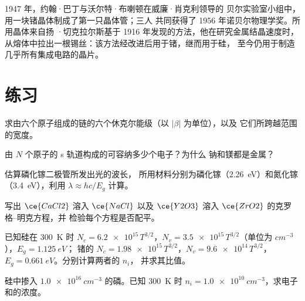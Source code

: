 \begin{history}[晶体管与提拉晶体]
1947 年，约翰·巴丁与沃尔特·布喇顿在威廉·肖克利领导的
贝尔实验室小组中，用一块锗晶体制成了第一只晶体管；三人
共同获得了 1956 年诺贝尔物理学奖。所用晶体来自扬
·切克拉尔斯基于 1916 年发现的方法，他在研究金属结晶速度时，
从熔体中拉出一根锡丝：该方法经改进后用于锗，继而用于硅，
至今仍用于制造几乎所有集成电路的晶片。
\end{history}

\section{练习}

\begin{exercise}[$\star$]\label{exo:b3:solid-state:1}
求由六个原子组成的链的六个休克尔能级（以 $|\beta|$ 为单位），以及
它们所跨越范围的宽度。
\end{exercise}

\begin{exercise}[$\star$]\label{exo:b3:solid-state:2}
由 $N$ 个原子的 s 轨道构成的可容纳多少个电子？为什么
钠和镁都是金属？
\end{exercise}

\begin{exercise}[$\star$]\label{exo:b3:solid-state:3}
估算磷化镓二极管所发出光的波长，
所用材料分别为磷化镓（\qty{2.26}{eV}）和氮化镓（\qty{3.4}{eV}），利用 $\lambda \approx hc/E_g$ 计算。
\end{exercise}

\begin{exercise}[$\star$]\label{exo:b3:solid-state:4}
写出 $\ce{CaCl2}$ 溶入 $\ce{NaCl}$ 以及 $\ce{Y2O3}$ 溶入 $\ce{ZrO2}$ 的克罗格–明克方程，并
检验每个方程是否配平。
\end{exercise}

\begin{exercise}[$\star\star$]\label{exo:b3:solid-state:5}
已知硅在 \qty{300}{K} 时 $N_c = \num{6.2e15}\,T^{3/2}$，$N_v = \num{3.5e15}\,T^{3/2}$（单位为 $\unit{cm^{-3}}$），$E_g = \qty{1.125}{eV}$；
锗的 $N_c = \num{1.98e15}\,T^{3/2}$，$N_v = \num{9.6e14}\,T^{3/2}$，$E_g = \qty{0.661}{eV}$。分别计算两者的 $n_i$，
并求其比值。
\end{exercise}

\begin{exercise}[$\star\star$]\label{exo:b3:solid-state:6}
硅中掺入 $\qty{1.0e16}{cm^{-3}}$ 的磷。已知
\qty{300}{K} 时 $n_i = \qty{1.0e10}{cm^{-3}}$，求电子和的浓度。
\end{exercise}

